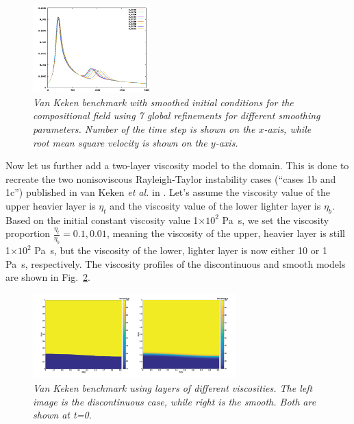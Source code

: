 \documentclass{article}
\begin{document}
\begin{figure}
        \centering
        \includegraphics[width=0.4\textwidth]{cookbooks/benchmarks/van-keken/smoothing-parameter-velocity.png}
        \caption{\it Van Keken benchmark with smoothed initial conditions for the compositional field using 7 global refinements for different smoothing parameters.  Number of the time step is shown on the $x$-axis, while root mean square velocity is shown on the $y$-axis.}
        \label{fig:vk-6}
\end{figure}

Now let us further add a two-layer viscosity model to the domain. This is done to recreate the two nonisoviscous Rayleigh-Taylor instability cases (``cases 1b and 1c'') published in van Keken \textit{et al.} in \cite{KKSCND97}.  Let's assume the viscosity value of the upper heavier layer is $\eta_{t}$ and the viscosity value of the lower lighter layer is $\eta_{b}$. Based on the initial constant viscosity value 1$\times10^{2}$ Pa~s, we set the viscosity proportion $\frac{\eta_{t}}{\eta_{b}}=0.1, 0.01$, meaning the viscosity of the upper, heavier layer is still 1$\times10^{2}$ Pa~s, but the viscosity of the lower, lighter layer is now either 10 or 1 Pa~s, respectively. The viscosity profiles of the discontinuous and smooth models are shown in Fig.~\ref{fig:vk-7}.

\begin{figure}
        \centering
        \includegraphics[width=0.7\textwidth]{cookbooks/benchmarks/van-keken/contrast_viscosity.png}
        \caption{\it Van Keken benchmark using layers of different viscosities. The left image is the discontinuous case, while right is the smooth.  Both are shown at t=0.}
        \label{fig:vk-7}
\end{figure}
\end{document}
